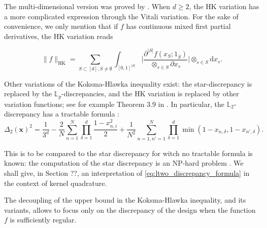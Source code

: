 \documentclass[twoside,11pt]{book}
\newtheorem{theorem}{Theorem}
\numberwithin{theorem}{chapter}
\numberwithin{definition}{chapter}
\numberwithin{proposition}{chapter}
\numberwithin{corollary}{chapter}
\numberwithin{example}{chapter}
\numberwithin{lemma}{chapter}
\begin{document}
The multi-dimensional version was proved by \cite{Hla61}. When $d \geq 2$, the HK variation has a more complicated expression through the Vitali variation. For the sake of convenience, we only mention that if $f$ has continuous mixed first partial derivatives, the HK variation reads

\begin{equation}
\|f\|_{\mathrm{HK}} = \sum\limits_{S \subset[d], S \neq \emptyset} \int_{[0,1]^{|S|}} \bigg|\frac{\partial^{|S|} f (x_S;1_{\bar{S}})}{\otimes_{s \in S}\partial x_{s}} \bigg| \otimes_{s \in S}\mathrm{d} x_{s}.
\end{equation}

Other variations of the Koksma-Hlawka inequality exist: the star-discrepancy is replaced by the $\mathbb{L}_{p}$-discrepancies, and the HK variation is replaced by other variation functions; see for example Theorem 3.9 in \citep{DiPi14}. In particular, the $\mathbb{L}_{2}$-discrepancy has a tractable formula \citep{War72}:
\begin{equation}\label{eq:ltwo_discrepancy_formula}
\Delta_{2}(\bm{x})^{2} = \frac{1}{3^{d}} - \frac{2}{N} \sum\limits_{n = 1}^{N} \prod\limits_{\delta=1}^{d} \frac{1-x_{n,i}^{2}}{2} + \frac{1}{N^2} \sum\limits_{n=1,n'=1}^{N} \prod\limits_{\delta=1}^{d} \min(1-x_{n,\delta},1-x_{n',\delta}).
\end{equation}

This is to be compared to the star discrepancy for witch no tractable formula is known: the computation of the star discrepancy is an NP-hard problem \citep{GnSrWi09}. We shall give, in Section ??, an interpretation of \eqref{eq:ltwo_discrepancy_formula} in the context of kernel quadrature.

The decoupling of the upper bound in the Koksma-Hlawka inequality, and its variants, allows to focus only on the discrepancy of the design when the function $f$ is sufficiently regular.




\end{document}
